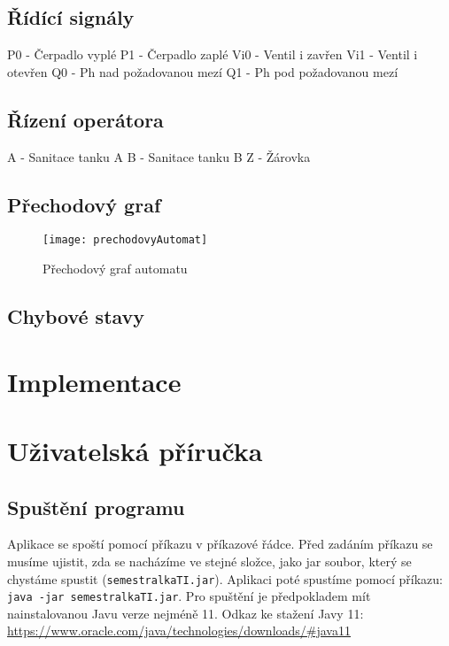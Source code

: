 \documentclass[12pt, a4paper]{article}
\begin{document}
\subsection{Řídící signály}
P0 - Čerpadlo vyplé \newline 
P1 - Čerpadlo zaplé \newline 
Vi0 - Ventil i zavřen \newline 
Vi1 - Ventil i otevřen \newline 
Q0 - Ph nad požadovanou mezí \newline 
Q1 - Ph pod požadovanou mezí 

\subsection{Řízení operátora}
A - Sanitace tanku A \newline 
B - Sanitace tanku B \newline 
Z - Žárovka

\subsection{Přechodový graf}
\begin{figure}
\centering 
\texttt{[image: prechodovyAutomat]}
\caption{Přechodový graf automatu}
\end{figure}

\subsection{Chybové stavy} \label{chyba}

\section{Implementace}

\section{Uživatelská příručka}

\subsection{Spuštění programu}
Aplikace se spoští pomocí příkazu v příkazové řádce. Před zadáním příkazu se musíme ujistit, zda se nacházíme ve stejné složce, jako jar soubor, který se chystáme spustit (\texttt{semestralkaTI.jar}). Aplikaci poté spustíme pomocí příkazu: \texttt{java -jar semestralkaTI.jar}. Pro spuštění je předpokladem mít nainstalovanou Javu verze nejméně 11. Odkaz ke stažení Javy 11: \url{ https://www.oracle.com/java/technologies/downloads/#java11}
\end{document}

